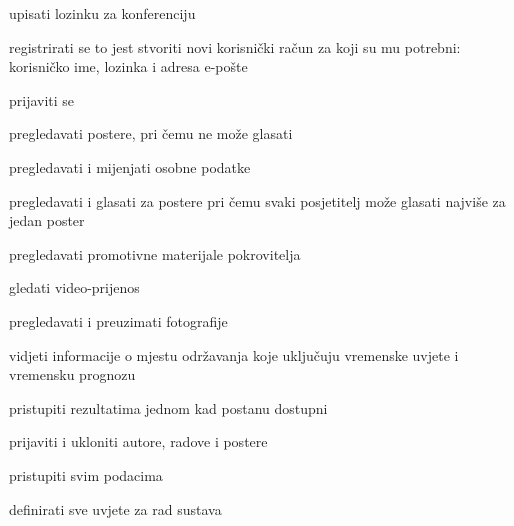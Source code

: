 			\begin{packed_enum}
				\item  {}
				
				\begin{packed_enum}
					
					\item upisati lozinku za konferenciju
					\item registrirati se to jest stvoriti novi korisnički račun za koji su mu potrebni: korisničko ime, lozinka i adresa e-pošte
					\item prijaviti se
					\item pregledavati postere, pri čemu ne može glasati
					
				\end{packed_enum}
			
				\item  {}
				
				\begin{packed_enum}
					
					\item pregledavati i mijenjati osobne podatke
					\item pregledavati i glasati za postere pri čemu svaki posjetitelj može glasati najviše za jedan poster
					\item pregledavati promotivne materijale pokrovitelja
					\item gledati video-prijenos
					\item pregledavati i preuzimati fotografije
					\item vidjeti informacije o mjestu održavanja koje uključuju vremenske uvjete i vremensku prognozu
					\item pristupiti rezultatima jednom kad postanu dostupni
				
				\end{packed_enum}
				
				\item {}
				
				\begin{packed_enum}
					
					\item prijaviti i ukloniti autore, radove i postere
					\item pristupiti svim podacima
					\item definirati sve uvjete za rad sustava
					

\end{packed_enum}
\end{packed_enum}
